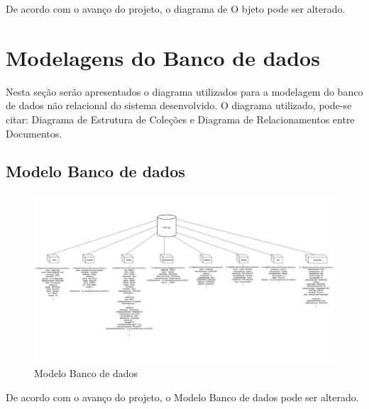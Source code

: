 \documentclass[
  a4paper,%
  12pt,%
  english,%
  brazilian,%
]{article}
\begin{document}
De acordo com o avanço do projeto, o diagrama de O  bjeto pode ser alterado.
\newpage
\section*{Modelagens do Banco de dados}
Nesta seção serão apresentados o diagrama utilizados para a modelagem do banco de dados não relacional do sistema desenvolvido. O diagrama utilizado, pode-se citar: Diagrama de Estrutura de Coleções e Diagrama de Relacionamentos entre Documentos. 

\subsection*{Modelo Banco de dados}

     \begin{figure}[h]
\centering
\caption{Modelo Banco de dados}%
\label{fig:modelo-conceitual}
\includegraphics[width=1.1\textwidth]{Logos/bancoBuffs.png}
\end{figure}
De acordo com o avanço do projeto, o Modelo Banco de dados pode ser alterado.

\newpage
\end{document}
